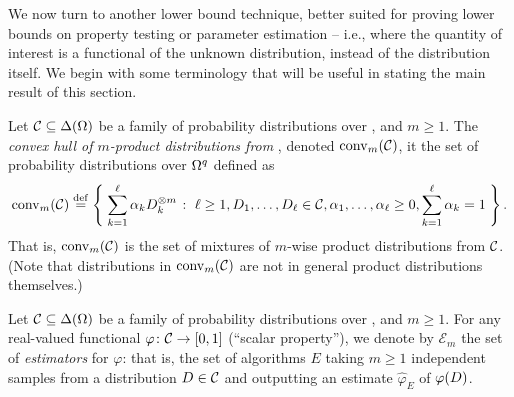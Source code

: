 \documentclass[11pt]{article}
\begin{document}
We now turn to another lower bound technique, better suited for proving lower bounds on property testing or parameter estimation -- i.e., where the quantity of interest is a functional of the unknown distribution, instead of the distribution itself. We begin with some terminology that will be useful in stating the main result of this section.
\begin{definition}
Let $\mathcal{C}\subseteq\Delta\!\left(\Omega\right)$ be a family of probability distributions over \domain, and $m\geq 1$. The \emph{convex hull of $m$-product distributions from \class}, denoted $\operatorname{conv}_m(\mathcal{C})$, it the set of probability distributions over $\Omega^q$ defined as
\[
  \operatorname{conv}_m(\mathcal{C}) \stackrel{\rm def}{=} \left\{\;  \sum_{k=1}^\ell \alpha_k D_k^{\otimes m}  \;\colon\;   \ell \geq 1, D_1,\dots,D_\ell\in\mathcal{C}, \alpha_1,\dots,\alpha_\ell \geq 0, \sum_{k=1}^\ell \alpha_k =1 \; \right\}.
\]
That is, $\operatorname{conv}_m(\mathcal{C})$ is the set of mixtures of $m$-wise product distributions from $\mathcal{C}$. (Note that distributions in $\operatorname{conv}_m(\mathcal{C})$ are not in general product distributions themselves.)
\end{definition}
\begin{definition}[Estimator]
Let $\mathcal{C}\subseteq\Delta\!\left(\Omega\right)$ be a family of probability distributions over \domain, and $m\geq 1$. For any real-valued functional $\varphi\colon\mathcal{C}\to[0,1]$ (``scalar property''), we denote by $\mathcal{E}_m$ the set of \emph{estimators} for $\varphi$: that is, the set of  algorithms $E$ taking $m\geq 1$ independent samples from a distribution $D\in\mathcal{C}$ and outputting an estimate $\hat{\varphi}_E$ of $\varphi(D)$.
\end{definition}
\end{document}
